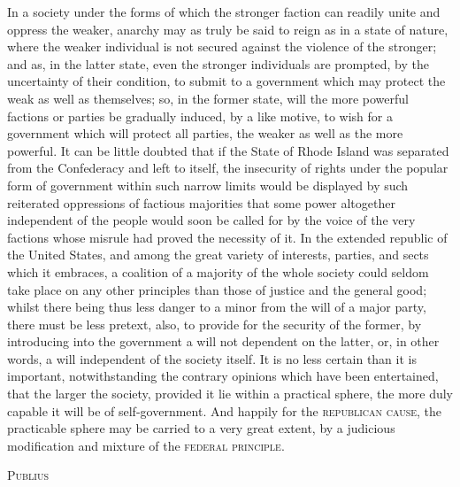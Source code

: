 In a society under the forms of which the stronger faction can readily unite and oppress the weaker, anarchy may as truly be said to reign as in a state of nature, where the weaker individual is not secured against the violence of the stronger; and as, in the latter state, even the stronger individuals are prompted, by the uncertainty of their condition, to submit to a government which may protect the weak as well as themselves; so, in the former state, will the more powerful factions or parties be gradually induced, by a like motive, to wish for a government which will protect all parties, the weaker as well as the more powerful. 
It can be little doubted that if the State of Rhode Island was separated from the Confederacy and left to itself, the insecurity of rights under the popular form of government within such narrow limits would be displayed by such reiterated oppressions of factious majorities that some power altogether independent of the people would soon be called for by the voice of the very factions whose misrule had proved the necessity of it. 
In the extended republic of the United States, and among the great variety of interests, parties, and sects which it embraces, a coalition of a majority of the whole society could seldom take place on any other principles than those of justice and the general good; whilst there being thus less danger to a minor from the will of a major party, there must be less pretext, also, to provide for the security of the former, by introducing into the government a will not dependent on the latter, or, in other words, a will independent of the society itself. 
It is no less certain than it is important, notwithstanding the contrary opinions which have been entertained, that the larger the society, provided it lie within a practical sphere, the more duly capable it will be of self-government. 
And happily for the \textsc{republican cause}, the practicable sphere may be carried to a very great extent, by a judicious modification and mixture of the \textsc{federal principle}.

\vspace{.5cm}
\textsc{Publius}

\vspace{1.5cm}

